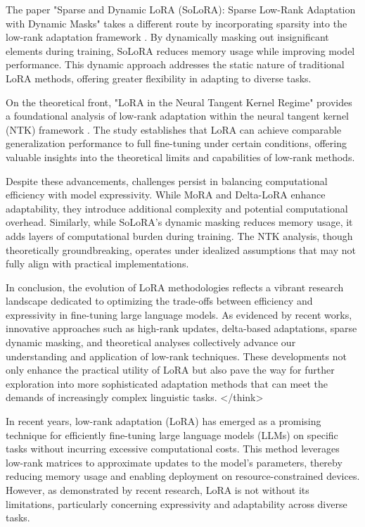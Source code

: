 \documentclass[conference]{IEEEtran}
\begin{document}
The paper "Sparse and Dynamic LoRA (SoLoRA): Sparse Low-Rank Adaptation with Dynamic Masks" takes a different route by incorporating sparsity into the low-rank adaptation framework \cite{d4}. By dynamically masking out insignificant elements during training, SoLoRA reduces memory usage while improving model performance. This dynamic approach addresses the static nature of traditional LoRA methods, offering greater flexibility in adapting to diverse tasks.

On the theoretical front, "LoRA in the Neural Tangent Kernel Regime" provides a foundational analysis of low-rank adaptation within the neural tangent kernel (NTK) framework \cite{e5}. The study establishes that LoRA can achieve comparable generalization performance to full fine-tuning under certain conditions, offering valuable insights into the theoretical limits and capabilities of low-rank methods.

Despite these advancements, challenges persist in balancing computational efficiency with model expressivity. While MoRA and Delta-LoRA enhance adaptability, they introduce additional complexity and potential computational overhead. Similarly, while SoLoRA's dynamic masking reduces memory usage, it adds layers of computational burden during training. The NTK analysis, though theoretically groundbreaking, operates under idealized assumptions that may not fully align with practical implementations.

In conclusion, the evolution of LoRA methodologies reflects a vibrant research landscape dedicated to optimizing the trade-offs between efficiency and expressivity in fine-tuning large language models. As evidenced by recent works, innovative approaches such as high-rank updates, delta-based adaptations, sparse dynamic masking, and theoretical analyses collectively advance our understanding and application of low-rank techniques. These developments not only enhance the practical utility of LoRA but also pave the way for further exploration into more sophisticated adaptation methods that can meet the demands of increasingly complex linguistic tasks.
</think>

In recent years, low-rank adaptation (LoRA) has emerged as a promising technique for efficiently fine-tuning large language models (LLMs) on specific tasks without incurring excessive computational costs. This method leverages low-rank matrices to approximate updates to the model's parameters, thereby reducing memory usage and enabling deployment on resource-constrained devices. However, as demonstrated by recent research, LoRA is not without its limitations, particularly concerning expressivity and adaptability across diverse tasks.
\end{document}
